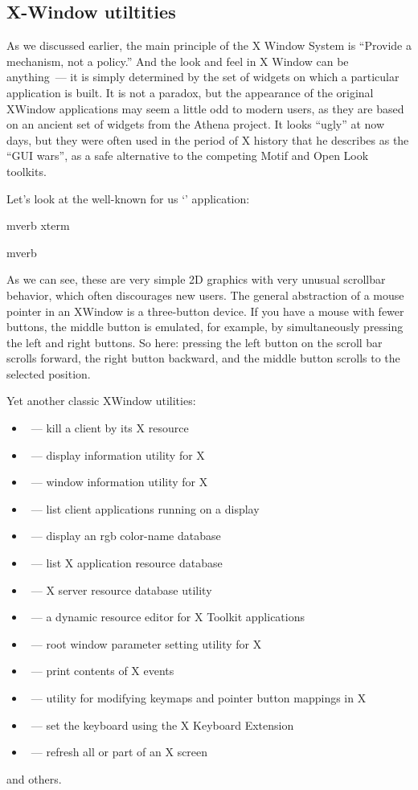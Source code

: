 \subsection*{X-Window utiltities} %

As we discussed earlier, the main principle of the X Window System is
``Provide a mechanism, not a policy.'' And the look and feel in X Window
can be anything~--- it is simply determined by the set of widgets on which
a particular application is built. It is not a paradox, but the appearance of
the original XWindow applications may seem a little odd to modern users,
as they are based on an ancient set of widgets from the Athena project.
It looks ``ugly'' at now days, but they were often used in the period of
X history that he describes as the ``GUI wars'', as a safe alternative to
the competing Motif and Open Look toolkits.

Let's look at the well-known for us `' application:
\begin{code}{mverb}
xterm
\end{code}{mverb}

As we can see, these are very simple 2D graphics with very unusual scrollbar
behavior, which often discourages new users. The general abstraction of
a mouse pointer in an XWindow is a three-button device. If you have a mouse
with fewer buttons, the middle button is emulated, for example,
by simultaneously pressing the left and right buttons. So here: pressing
the left button on the scroll bar scrolls forward, the right button backward,
and the middle button scrolls to the selected position.

Yet another classic XWindow utilities:
\begin{itemize}
\item[]~--- kill a client by its X resource
\item[]~--- display information utility for X
\item[]~--- window information utility for X
\item[]~--- list client applications running on a display
\item[]~--- display an rgb color-name database
\item[]~--- list X application resource database
\item[]~--- X server resource database utility
\item[]~--- a dynamic resource editor for X Toolkit applications
\item[]~--- root window parameter setting utility for X
\item[]~--- print contents of X events
\item[]~--- utility for modifying keymaps and pointer button mappings in X
\item[]~--- set the keyboard using the X Keyboard Extension
\item[]~--- refresh all or part of an X screen
\end{itemize}
and others.
